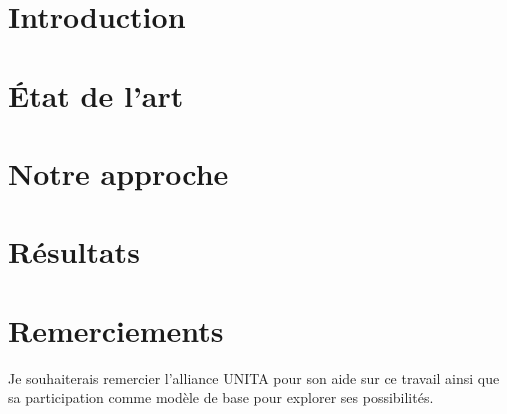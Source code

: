 \documentclass{cnriut} %
\begin{document}
\creationEnTete        %

\section{Introduction}


\section{État de l'art}


\section{Notre approche}


\section{Résultats}


\section{Remerciements}
Je souhaiterais remercier l'alliance UNITA pour son aide sur ce travail ainsi que sa participation comme modèle de base pour explorer ses possibilités.

\printbibliography
\end{document}
